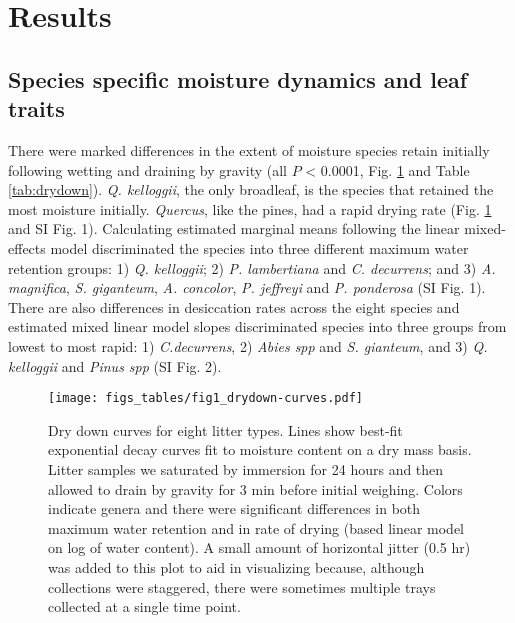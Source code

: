 \documentclass[fire,article,submit,moreauthors,pdftex]{Definitions/mdpi}
\begin{document}
\section{Results}

\subsection{Species specific moisture dynamics and leaf traits}

There were marked differences in the extent of moisture species retain initially
following wetting and draining by gravity (all $P$ < 0.0001, Fig.
\ref{fig:drydown} and Table \ref{tab:drydown}). \emph{Q. kelloggii}, the only
broadleaf, is the species that retained the most moisture initially.
\emph{Quercus}, like the pines, had a rapid drying rate (Fig.
\ref{fig:drydown} and SI Fig. 1). Calculating estimated marginal means following the
linear mixed-effects model discriminated the species into three different
maximum water retention groups: 1) \emph{Q. kelloggii}; 2) \emph{P.
  lambertiana} and \emph{C. decurrens}; and 3) \emph{A. magnifica}, \emph{S.
  giganteum}, \emph{A. concolor}, \emph{P. jeffreyi} and \emph{P. ponderosa}
(SI Fig. 1). There are also differences in desiccation rates across the eight
species and estimated mixed linear model slopes discriminated species into
three groups from lowest to most rapid: 1) \emph{C.decurrens}, 2) \emph{Abies
  spp} and \emph{S. gianteum}, and 3) \emph{Q. kelloggii} and \emph{Pinus spp}
(SI Fig. 2).

\begin{figure}[H]
  \centering
\texttt{[image: figs\_tables/fig1\_drydown-curves.pdf]}
\caption{Dry down curves for eight litter types. Lines show best-fit
  exponential decay curves fit to moisture content on a dry mass basis. Litter
  samples we saturated by immersion for 24 hours and then allowed to drain by
  gravity for 3 min before initial weighing. Colors indicate genera and there
  were significant differences in both maximum water retention and in rate of drying (based linear model on log of water content). A small amount of horizontal jitter
  (0.5 hr) was added to this plot to aid in visualizing because, although
  collections were staggered, there were sometimes multiple trays collected at a
  single time point.}
 \label{fig:drydown}
\end{figure}
\end{document}
